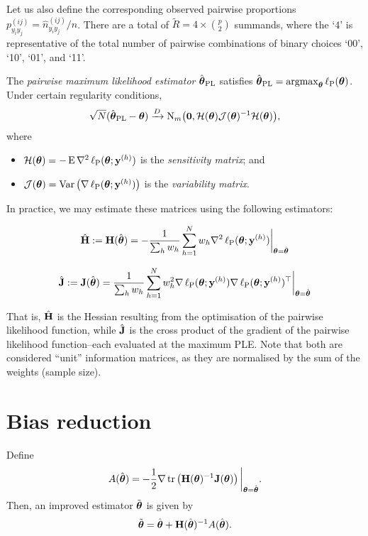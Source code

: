 \documentclass[
]{article}
\providecommand{\tightlist}{%
  \setlength{\itemsep}{0pt}\setlength{\parskip}{0pt}}
\begin{document}
Let us also define the corresponding observed pairwise proportions
\(p_{y_iy_j}^{(ij)} = \hat n_{y_iy_j}^{(ij)}/n\). There are a total of
\(\tilde R = 4 \times {p \choose 2}\) summands, where the `4' is
representative of the total number of pairwise combinations of binary
choices `00', `10', `01', and `11'.

The \emph{pairwise maximum likelihood estimator}
\(\hat{{\boldsymbol\theta}}_{\text{PL}}\) satisfies
\(\hat{{\boldsymbol\theta}}_{\text{PL}}= \operatorname{argmax}_{{\boldsymbol\theta}} \operatorname{\ell_P}({\boldsymbol\theta})\).
Under certain regularity conditions, \begin{equation}
\sqrt N (\hat{{\boldsymbol\theta}}_{\text{PL}}- {\boldsymbol\theta}) \xrightarrow{D} {\operatorname{N}}_m\big({\mathbf 0}, {\mathcal H}({\boldsymbol\theta}){\mathcal J}({\boldsymbol\theta})^{-1}{\mathcal H}({\boldsymbol\theta})\big),
\end{equation} where

\begin{itemize}
\tightlist
\item
  \({\mathcal H}({\boldsymbol\theta})=-\operatorname{E}\nabla^2\operatorname{\ell_P}({\boldsymbol\theta};{\mathbf y}^{(h)})\)
  is the \emph{sensitivity matrix}; and
\item
  \({\mathcal J}({\boldsymbol\theta})=\operatorname{Var}\big( \nabla\operatorname{\ell_P}({\boldsymbol\theta};{\mathbf y}^{(h)})\big)\)
  is the \emph{variability matrix}.
\end{itemize}

In practice, we may estimate these matrices using the following
estimators:

\[
\hat{{\mathbf H}} := {\mathbf H}(\hat{{\boldsymbol\theta}})  = -\frac{1}{\sum_h w_h}\sum_{h=1}^N w_h\nabla^2\operatorname{\ell_P}({\boldsymbol\theta};{\mathbf y}^{(h)}) \bigg|_{{\boldsymbol\theta} = \hat{{\boldsymbol\theta}}}
\]

\[
\hat{{\mathbf J}} := {\mathbf J}(\hat{{\boldsymbol\theta}}) = \frac{1}{\sum_h w_h}\sum_{h=1}^N w_h^2\nabla\operatorname{\ell_P}({\boldsymbol\theta};{\mathbf y}^{(h)})\nabla\operatorname{\ell_P}({\boldsymbol\theta};{\mathbf y}^{(h)})^\top \bigg|_{{\boldsymbol\theta} = \hat{{\boldsymbol\theta}}}
\]

That is, \(\hat{{\mathbf H}}\) is the Hessian resulting from the optimisation of
the pairwise likelihood function, while \(\hat{{\mathbf J}}\) is the cross product
of the gradient of the pairwise likelihood function--each evaluated at
the maximum PLE. Note that both are considered ``unit'' information
matrices, as they are normalised by the sum of the weights (sample
size).

\section{Bias reduction}\label{bias-reduction}

Define \[
A(\hat{{\boldsymbol\theta}}) = - \frac{1}{2} \nabla \operatorname{tr}\left( {\mathbf H}({\boldsymbol\theta})^{-1}{\mathbf J}({\boldsymbol\theta}) \right) \bigg|_{{\boldsymbol\theta} = \hat{{\boldsymbol\theta}}} .
\] Then, an improved estimator \(\tilde{{\boldsymbol\theta}}\) is given by \[
\tilde{{\boldsymbol\theta}} = \hat{{\boldsymbol\theta}} + {\mathbf H}(\hat{{\boldsymbol\theta}})^{-1}A(\hat{{\boldsymbol\theta}}).
\]
\end{document}
